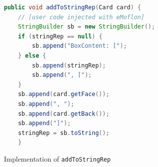 \newpage

\vspace*{3cm}

\begin{figure}[h!]
\centering
\begin{lstlisting}[language=Java, keywordstyle={\bfseries\color{purple}}, backgroundcolor=\color{white}]
public void addToStringRep(Card card) {
	// [user code injected with eMoflon]
	StringBuilder sb = new StringBuilder();
	if (stringRep == null) {
		sb.append("BoxContent: [");
	} else {
		sb.append(stringRep);
		sb.append(", [");
	}
	sb.append(card.getFace());
	sb.append(", ");
	sb.append(card.getBack());
	sb.append("]");
	stringRep = sb.toString();
	}
        \end{lstlisting}
        \caption{Implementation of \texttt{addToStringRep}}
        \label{code:addToStringRep_inject_file}
    \end{figure}
    \FloatBarrier

